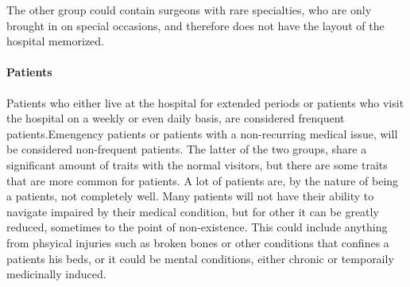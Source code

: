 The other group could contain surgeons with rare specialties, who are only brought in on special occasions, and therefore does not have the layout of the hospital memorized.

\paragraph{Patients} %

Patients who either live at the hospital for extended periods or patients who visit the hospital on a weekly or even daily basis, are considered frenquent patients.Emengency patients or patients with a non-recurring medical issue, will be considered non-frequent patients. The latter of the two groups, share a significant amount of traits with the normal visitors, but there are some traits that are more common for patients.
A lot of patients are, by the nature of being a patients, not completely well. Many patients will not have their ability to navigate impaired by their medical condition, but for other it can be greatly reduced, sometimes to the point of non-existence. This could include anything from phsyical injuries such as broken bones or other conditions that confines a patients his beds, or it could be mental conditions, either chronic or temporaily medicinally induced.



